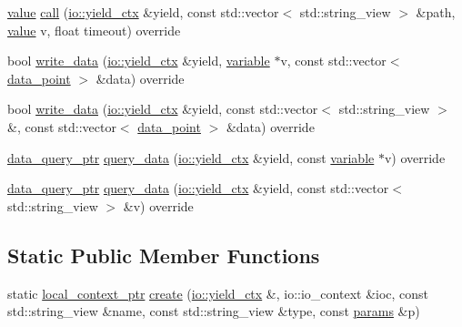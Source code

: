 \begin{DoxyCompactItemize}
\item 
\hyperlink{classtelegraph_1_1value}{value} \hyperlink{classtelegraph_1_1dummy__device_ab037df44b352953369760dd6071d84b5}{call} (\hyperlink{structboost_1_1asio_1_1yield__ctx}{io\+::yield\+\_\+ctx} \&yield, const std\+::vector$<$ std\+::string\+\_\+view $>$ \&path, \hyperlink{classtelegraph_1_1value}{value} v, float timeout) override
\item 
bool \hyperlink{classtelegraph_1_1dummy__device_a162f8f7a02c2907693ecf86662f6ffe1}{write\+\_\+data} (\hyperlink{structboost_1_1asio_1_1yield__ctx}{io\+::yield\+\_\+ctx} \&yield, \hyperlink{classtelegraph_1_1variable}{variable} $\ast$v, const std\+::vector$<$ \hyperlink{classtelegraph_1_1data__point}{data\+\_\+point} $>$ \&data) override
\item 
bool \hyperlink{classtelegraph_1_1dummy__device_a2d18fd0ec74a6d4bb76f789135403f19}{write\+\_\+data} (\hyperlink{structboost_1_1asio_1_1yield__ctx}{io\+::yield\+\_\+ctx} \&yield, const std\+::vector$<$ std\+::string\+\_\+view $>$ \&, const std\+::vector$<$ \hyperlink{classtelegraph_1_1data__point}{data\+\_\+point} $>$ \&data) override
\item 
\hyperlink{namespacetelegraph_a6ffe775ac48dca2a4013b53d692199c8}{data\+\_\+query\+\_\+ptr} \hyperlink{classtelegraph_1_1dummy__device_a23b7704d488ca5e9ac732256621e8137}{query\+\_\+data} (\hyperlink{structboost_1_1asio_1_1yield__ctx}{io\+::yield\+\_\+ctx} \&yield, const \hyperlink{classtelegraph_1_1variable}{variable} $\ast$v) override
\item 
\hyperlink{namespacetelegraph_a6ffe775ac48dca2a4013b53d692199c8}{data\+\_\+query\+\_\+ptr} \hyperlink{classtelegraph_1_1dummy__device_ae7820cd8f1d5683ccc90b7256e88a735}{query\+\_\+data} (\hyperlink{structboost_1_1asio_1_1yield__ctx}{io\+::yield\+\_\+ctx} \&yield, const std\+::vector$<$ std\+::string\+\_\+view $>$ \&v) override
\end{DoxyCompactItemize}
\subsection*{Static Public Member Functions}
\begin{DoxyCompactItemize}
\item 
static \hyperlink{namespacetelegraph_ab59c7b38d99a98b4acc22433c920b1e6}{local\+\_\+context\+\_\+ptr} \hyperlink{classtelegraph_1_1dummy__device_a185602ee7a397af9cf23a5bb1bab50d3}{create} (\hyperlink{structboost_1_1asio_1_1yield__ctx}{io\+::yield\+\_\+ctx} \&, io\+::io\+\_\+context \&ioc, const std\+::string\+\_\+view \&name, const std\+::string\+\_\+view \&type, const \hyperlink{classtelegraph_1_1params}{params} \&p)
\end{DoxyCompactItemize}
